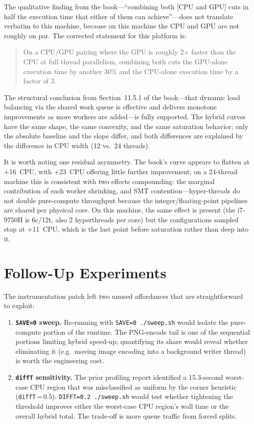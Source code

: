 \documentclass[
	english,
	letterpaper, oneside
]{article}
\begin{document}
The qualitative finding from the book---``combining both
[CPU and GPU] cuts in half the execution time that either of them can
achieve''---does not translate verbatim to this machine, because on
this machine the CPU and GPU are not roughly on par. The corrected
statement for this platform is:

\begin{quote}
On a CPU/GPU pairing where the GPU is roughly 2$\times$ faster
than the CPU at full thread parallelism, combining both cuts the
GPU-alone execution time by another 30\% and the CPU-alone execution
time by a factor of 3.
\end{quote}

The structural conclusion from Section~11.5.1 of the book---that
dynamic load balancing via the shared work queue is effective and
delivers monotone improvements as more workers are added---is fully
supported. The hybrid curves have the same shape, the same convexity,
and the same saturation behavior; only the absolute baseline and the
slope differ, and both differences are explained by the difference in
CPU width (12 vs.\ 24 threads).

It is worth noting one residual asymmetry. The book's curve appears to
flatten at +16~CPU, with +23~CPU offering little further improvement;
on a 24-thread machine this is consistent with two effects compounding:
the marginal contribution of each worker shrinking, and SMT
contention---hyper-threads do not double pure-compute throughput
because the integer/floating-point pipelines are shared per physical
core. On this machine, the same effect is present (the i7-9750H is
6c/12t, also 2 hyperthreads per core) but the configurations sampled
stop at +11~CPU, which is the last point before saturation rather than
deep into it.

\section{Follow-Up Experiments}

The instrumentation patch left two unused affordances that are
straightforward to exploit:

\begin{enumerate}
    \item \textbf{\texttt{SAVE=0} sweep.} Re-running with
    \texttt{SAVE=0 ./sweep.sh} would isolate the pure-compute portion
    of the runtime. The PNG-encode tail is one of the sequential
    portions limiting hybrid speed-up; quantifying its share would
    reveal whether eliminating it (e.g.\ moving image encoding into a
    background writer thread) is worth the engineering cost.
    \item \textbf{\texttt{diffT} sensitivity.} The prior profiling
    report identified a 15.3-second worst-case CPU region that was
    misclassified as uniform by the corner heuristic
    (\texttt{diffT}\,=\,0.5). \texttt{DIFFT=0.2 ./sweep.sh} would test
    whether tightening the threshold improves either the worst-case CPU
    region's wall time or the overall hybrid total. The trade-off is
    more queue traffic from forced splits.
\end{enumerate}
\end{document}
